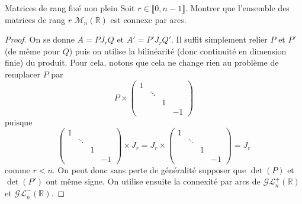 \documentclass[french,a4paper]{article}
\newcommand{\R}{\mathbb{R}}
\theoremstyle{plain}
\theoremstyle{definition}
\theoremstyle{remark}
\begin{document}
\begin{ex}{Matrices de rang fixé non plein}
	Soit $r\in\llbracket0,n-1\rrbracket$. Montrer que l'ensemble des matrices de rang $r$ $\mathcal{M}_n(\R)$ est connexe par arcs.
\end{ex}
\begin{proof}
	On se donne $A=PJ_rQ$ et $A'=P'J_rQ'$. Il suffit simplement relier $P$ et $P'$ (de même pour $Q$) puis on utilise la bilinéarité (donc continuité en dimension finie) du produit. Pour cela, notons que cela ne change rien au problème de remplacer $P$ par $$P\times\begin{pmatrix}
		1&&\\
		&\ddots&&\\
		&&1&\\
		&&&-1
	\end{pmatrix}$$ puisque $$\begin{pmatrix}
		1&&\\
		&\ddots&&\\
		&&1&\\
		&&&-1
	\end{pmatrix}\times J_r=J_r \times \begin{pmatrix}
		1&&\\
		&\ddots&&\\
		&&1&\\
		&&&-1
	\end{pmatrix}=J_r$$ comme $r<n$. On peut donc sans perte de généralité supposer que $\det(P)$ et $\det(P')$ ont même signe. On utilise ensuite la connexité par arcs de $\mathcal{GL}_n^+(\R)$ et $\mathcal{GL}_n^-(\R)$.
\end{proof}
\end{document}
